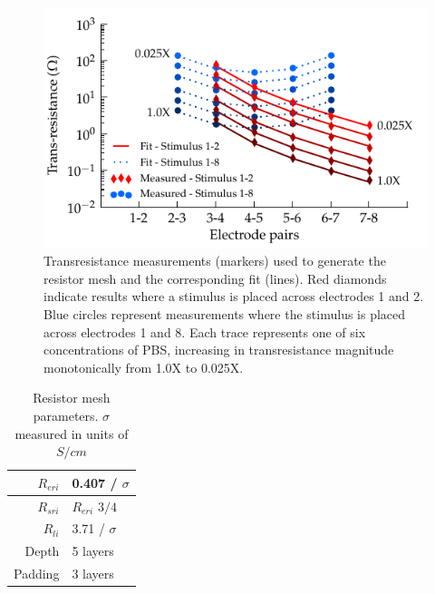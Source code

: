 \documentclass[journal, a4paper]{IEEEtran}
\begin{document}
\begin{figure}
    \begin{center}
        \includegraphics{graphics/pbs_transimpedance_IEEE}
    \end{center}
    \caption{Transresistance measurements (markers) used to generate the resistor mesh and the corresponding fit (lines). Red diamonds indicate results where a stimulus is placed across electrodes 1 and 2. Blue circles represent measurements where the stimulus is placed across electrodes 1 and 8. Each trace represents one of six concentrations of PBS, increasing in transresistance magnitude monotonically from 1.0X to 0.025X.}
    \label{fig:transresistance}
\end{figure}

\begin{table}
    \begin{center}
        \begin{tabular}{|r|l|}
            \hline
            $R_{eri}$ & 0.407 / $\sigma$ \\ \hline
            $R_{sri}$ & $R_{eri}$ $3/4$ \\ \hline
            $R_{li}$ & 3.71 / $\sigma$ \\ \hline
            Depth & 5 layers \\ \hline
            Padding & 3 layers \\ \hline
        \end{tabular}
    \end{center}
    \caption{Resistor mesh parameters. $\sigma$ measured in units of $S/cm$}
    \label{tab:RESparams}
\end{table}
\end{document}
